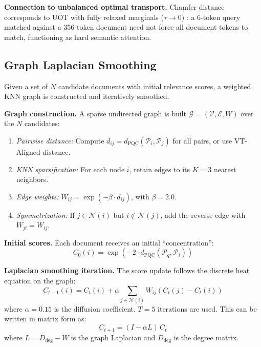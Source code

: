 \documentclass[review,1p]{elsarticle}
\begin{document}
\textbf{Connection to unbalanced optimal transport.} Chamfer distance corresponds to UOT with fully relaxed marginals ($\tau \to 0$) \citep{sejourne2023uot}: a 6-token query matched against a 356-token document need not force all document tokens to match, functioning as hard semantic attention.

\subsection{Graph Laplacian Smoothing}
\label{subsec:graph-smoothing}

Given a set of $N$ candidate documents with initial relevance scores, a weighted KNN graph is constructed and iteratively smoothed.

\textbf{Graph construction.} A sparse undirected graph is built $\mathcal{G} = (\mathcal{V}, \mathcal{E}, W)$ over the $N$ candidates:
\begin{enumerate}[leftmargin=*]
\item \textit{Pairwise distance:} Compute $d_{ij} = d_{\mathrm{PQC}}(\mathcal{P}_i, \mathcal{P}_j)$ for all pairs, or use VT-Aligned distance.
\item \textit{KNN sparsification:} For each node $i$, retain edges to its $K = 3$ nearest neighbors.
\item \textit{Edge weights:} $W_{ij} = \exp(-\beta \cdot d_{ij})$, with $\beta = 2.0$.
\item \textit{Symmetrization:} If $j \in \mathcal{N}(i)$ but $i \notin \mathcal{N}(j)$, add the reverse edge with $W_{ji} = W_{ij}$.
\end{enumerate}

\textbf{Initial scores.} Each document receives an initial ``concentration'':
\begin{equation}
\label{eq:init-score}
C_0(i) = \exp(-2 \cdot d_{\mathrm{PQC}}(\mathcal{P}_q, \mathcal{P}_i))
\end{equation}

\textbf{Laplacian smoothing iteration.} The score update follows the discrete heat equation on the graph:
\begin{equation}
\label{eq:laplacian-update}
C_{t+1}(i) = C_t(i) + \alpha \sum_{j \in \mathcal{N}(i)} W_{ij} \left( C_t(j) - C_t(i) \right)
\end{equation}
where $\alpha = 0.15$ is the diffusion coefficient. $T = 5$ iterations are used. This can be written in matrix form as:
\begin{equation}
\label{eq:matrix-form}
C_{t+1} = (I - \alpha L)\, C_t
\end{equation}
where $L = D_{\mathrm{deg}} - W$ is the graph Laplacian and $D_{\mathrm{deg}}$ is the degree matrix.
\end{document}

